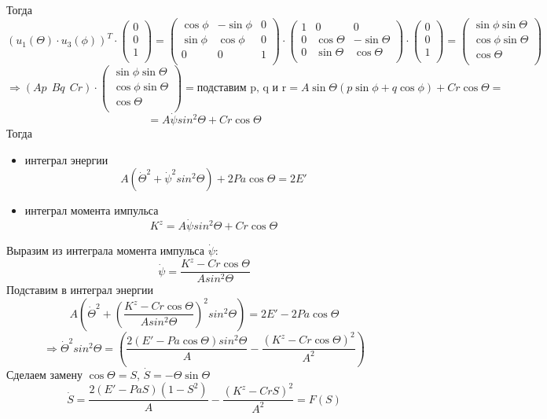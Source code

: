 Тогда
\[
\left(u_1(\Theta) \cdot u_3(\phi)\right)^T \cdot \begin{pmatrix}
    0\\
    0\\
    1\\
\end{pmatrix} = \begin{pmatrix}
    \cos{\phi} & -\sin{\phi} & 0 \\
    \sin{\phi} & \cos{\phi} & 0 \\
    0 & 0 & 1\\
\end{pmatrix} \cdot \begin{pmatrix}
    1 & 0 & 0\\
    0 & \cos{\Theta} & -\sin{\Theta}\\
    0 & \sin{\Theta} & \cos{\Theta}\\
\end{pmatrix} \cdot \begin{pmatrix}
    0\\
    0\\
    1\\
\end{pmatrix} = \begin{pmatrix}
    \sin{\phi} \sin{\Theta}\\
    \cos{\phi}\sin{\Theta}\\
    \cos{\Theta}\\
\end{pmatrix}
\]
\[
\Longrightarrow \left(Ap~~Bq~~Cr\right) \cdot \begin{pmatrix}
    \sin{\phi} \sin{\Theta}\\
    \cos{\phi}\sin{\Theta}\\
    \cos{\Theta}\\
\end{pmatrix} = \text{подставим p, q и r} = A \sin{\Theta}(p \sin{\phi} + q\cos{\phi}) + Cr\cos{\Theta} = 
\]
\[
= A\dot{\psi}sin^2 \Theta + Cr\cos{\Theta}
\]
Тогда
\begin{itemize}
    \item интеграл энергии
    \[
    A(\dot{\Theta}^2 + \dot{\psi}^2 sin^2 \Theta) + 2P a \cos{\Theta} = 2E'
    \]
    \item интеграл момента импульса
    \[
    K^z = A\dot{\psi}sin^2\Theta + Cr\cos{\Theta}
    \]
\end{itemize}

Выразим из интеграла момента импульса $\dot{\psi}$:
\[
\dot{\psi} = \dfrac{K^z - Cr\cos{\Theta}}{A sin^2 \Theta}
\]
Подставим в интеграл энергии
\[
A(\dot{\Theta}^2 + \left(\dfrac{K^z - Cr\cos{\Theta}}{A sin^2 \Theta}\right)^2 sin^2 \Theta) = 2E' - 2P a \cos{\Theta}
\]
\[
\Longrightarrow \dot{\Theta}^2 sin^2 \Theta = \left( \dfrac{2(E' - P a \cos{\Theta})sin^2 \Theta}{A} - \dfrac{(K^z - Cr\cos{\Theta})^2}{A^2}\right)
\]
Сделаем замену $\cos{\Theta} = S$, $\dot{S} = -\Theta\sin{\Theta}$
\[
\dot{S} = \dfrac{2(E' - P a S) (1 - S^2)}{A} - \dfrac{(K^z - CrS)^2}{A^2} = F(S)
\]


